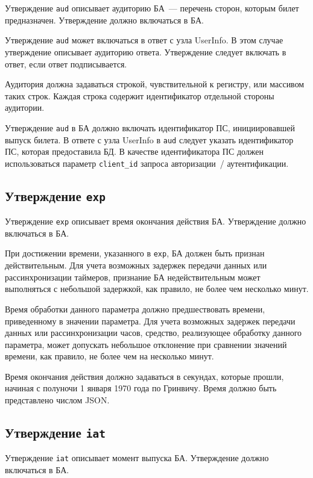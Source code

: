 Утверждение \lstinline{aud} описывает аудиторию БА~--- перечень сторон,
которым билет предназначен. Утверждение должно включаться в БА.

Утверждение \lstinline{aud} может включаться в ответ с узла UserInfo.
В этом случае утверждение описывает аудиторию ответа.
%
Утверждение следует включать в ответ, если ответ подписывается.

Аудитория должна задаваться строкой, чувствительной к регистру, 
или массивом таких строк. Каждая строка содержит идентификатор отдельной 
стороны аудитории.

Утверждение \lstinline{aud} в БА должно включать идентификатор ПС,
инициировавшей выпуск билета. 
%
В ответе с узла UserInfo в \lstinline{aud} следует указать идентификатор ПС, 
которая предоставила БД.
%
В качестве идентификатора ПС должен использоваться параметр 
\lstinline{client_id} запроса авторизации~/ аутентификации.

\subsection{Утверждение \lstinline{exp}}\label{CLAIMS.Exp}

Утверждение \lstinline{exp} описывает время окончания действия БА.
Утверждение должно включаться в БА.

При достижении времени, указанного в \lstinline{exp}, БА должен быть признан
действительным. Для учета возможных задержек передачи данных или
рассинхронизации таймеров, признание БА недействительным может выполняться с
небольшой задержкой, как правило, не более чем несколько минут.

Время обработки данного параметра должно предшествовать времени, 
приведенному в значении параметра. Для учета возможных задержек передачи 
данных или рассинхронизации часов, средство, реализующее обработку данного 
параметра, может допускать небольшое отклонение при сравнении значений времени, 
как правило, не более чем на несколько минут.

Время окончания действия должно задаваться в секундах, которые прошли, начиная 
с полуночи 1 января 1970 года по Гринвичу. Время должно быть представлено числом 
JSON.

\subsection{Утверждение \lstinline{iat}}\label{CLAIMS.Iat}

Утверждение \lstinline{iat} описывает момент выпуска БА.
Утверждение должно включаться в БА.

